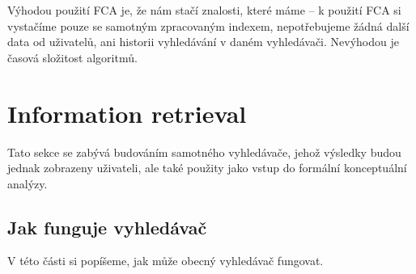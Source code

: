 \documentclass[12pt]{article}
\begin{document}
Výhodou použití FCA je, že nám stačí znalosti, které máme -- k použití FCA si vystačíme pouze se samotným zpracovaným indexem, nepotřebujeme žádná další data od uživatelů, ani historii vyhledávání v daném vyhledávači. Nevýhodou je časová složitost algoritmů. 

\newpage
\section{Information retrieval}

Tato sekce se zabývá budováním samotného vyhledávače, jehož výsledky budou jednak zobrazeny uživateli, ale také použity jako vstup do formální konceptuální analýzy. 

\subsection{Jak funguje vyhledávač}
V této části si popíšeme, jak může obecný vyhledávač fungovat. 
\end{document}
